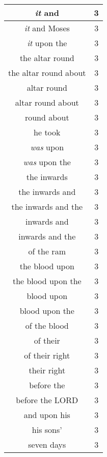 \begin{center}
\begin{longtable}{|c|c|}
\emph{it} and & 3\\ \hline 
\emph{it} and Moses & 3\\ \hline 
\emph{it} upon the & 3\\ \hline 
the altar round & 3\\ \hline 
the altar round about & 3\\ \hline 
altar round & 3\\ \hline 
altar round about & 3\\ \hline 
round about & 3\\ \hline 
he took & 3\\ \hline 
\emph{was} upon & 3\\ \hline 
\emph{was} upon the & 3\\ \hline 
the inwards & 3\\ \hline 
the inwards and & 3\\ \hline 
the inwards and the & 3\\ \hline 
inwards and & 3\\ \hline 
inwards and the & 3\\ \hline 
of the ram & 3\\ \hline 
the blood upon & 3\\ \hline 
the blood upon the & 3\\ \hline 
blood upon & 3\\ \hline 
blood upon the & 3\\ \hline 
of the blood & 3\\ \hline 
of their & 3\\ \hline 
of their right & 3\\ \hline 
their right & 3\\ \hline 
before the & 3\\ \hline 
before the LORD & 3\\ \hline 
and upon his & 3\\ \hline 
his sons' & 3\\ \hline 
seven days & 3\\ \hline 
\end{longtable}
\end{center}





